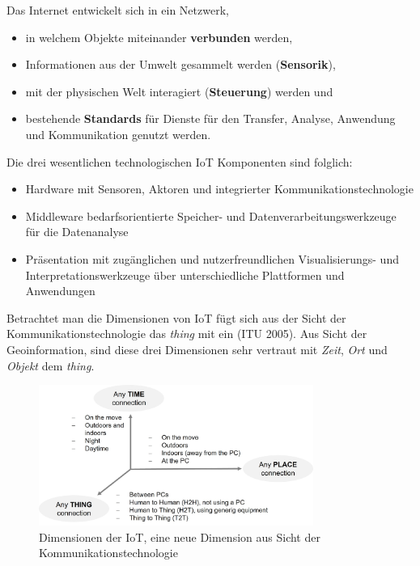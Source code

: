 \documentclass[
  11pt,
  a4paper,
  oneside, openany  ,captions=tableheading
]{scrbook}
\providecommand{\tightlist}{%
  \setlength{\itemsep}{0pt}\setlength{\parskip}{0pt}}
\theoremstyle{remark}
\begin{document}
Das Internet entwickelt sich in ein Netzwerk,

\begin{itemize}
\tightlist
\item
  in welchem Objekte miteinander \textbf{verbunden} werden,
\item
  Informationen aus der Umwelt gesammelt werden (\textbf{Sensorik}),
\item
  mit der physischen Welt interagiert (\textbf{Steuerung}) werden und
\item
  bestehende \textbf{Standards} für Dienste für den Transfer, Analyse,
  Anwendung und Kommunikation genutzt werden.
\end{itemize}

Die drei wesentlichen technologischen IoT Komponenten sind folglich:

\begin{itemize}
\tightlist
\item
  Hardware mit Sensoren, Aktoren und integrierter
  Kommunikationstechnologie
\item
  Middleware bedarfsorientierte Speicher- und
  Datenverarbeitungswerkzeuge für die Datenanalyse
\item
  Präsentation mit zugänglichen und nutzerfreundlichen Visualisierungs-
  und Interpretationswerkzeuge über unterschiedliche Plattformen und
  Anwendungen
\end{itemize}

Betrachtet man die Dimensionen von IoT fügt sich aus der Sicht der
Kommunikationstechnologie das \emph{thing} mit ein (ITU 2005). Aus Sicht
der Geoinformation, sind diese drei Dimensionen sehr vertraut mit
\emph{Zeit}, \emph{Ort} und \emph{Objekt} dem \emph{thing}.

\begin{figure}[H]

{\centering \includegraphics[width=0.8\textwidth,height=\textheight]{images/iot_dimension.jpg}

}

\caption{Dimensionen der IoT, eine neue Dimension aus Sicht der
Kommunikationstechnologie}

\end{figure}%
\end{document}
